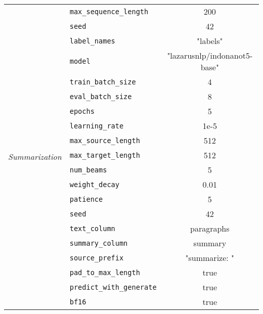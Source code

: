 \begin{table}[h]
{\begin{tabular}{|c|l|c|}
                                                         & \texttt{max\_sequence\_length} & 200 \\ \cline{2-3}
                                                         & \texttt{seed} & 42 \\ \cline{2-3}
                                                         & \texttt{label\_names} & "labels" \\ \hline
            \multirow{14}{*}{\textit{Summarization}} & \texttt{model} & "lazarusnlp/indonanot5-base" \\ \cline{2-3}
                                                    & \texttt{train\_batch\_size} & 4 \\ \cline{2-3}
                                                    & \texttt{eval\_batch\_size} & 8 \\ \cline{2-3}
                                                    & \texttt{epochs} & 5 \\ \cline{2-3}
                                                    & \texttt{learning\_rate} & 1e-5 \\ \cline{2-3}
                                                    & \texttt{max\_source\_length} & 512 \\ \cline{2-3}
                                                    & \texttt{max\_target\_length} & 512 \\ \cline{2-3}
                                                    & \texttt{num\_beams} & 5 \\ \cline{2-3}
                                                    & \texttt{weight\_decay} & 0.01 \\ \cline{2-3}
                                                    & \texttt{patience} & 5 \\ \cline{2-3}
                                                    & \texttt{seed} & 42 \\ \cline{2-3}
                                                    & \texttt{text\_column} & paragraphs \\ \cline{2-3}
                                                    & \texttt{summary\_column} & summary \\ \cline{2-3}
                                                    & \texttt{source\_prefix} & "summarize: " \\ \cline{2-3}
                                                    & \texttt{pad\_to\_max\_length} & true \\ \cline{2-3}
                                                    & \texttt{predict\_with\_generate} & true \\ \cline{2-3}
                                                    & \texttt{bf16} & true \\ \hline
        \end{tabular}
    }
\end{table}

